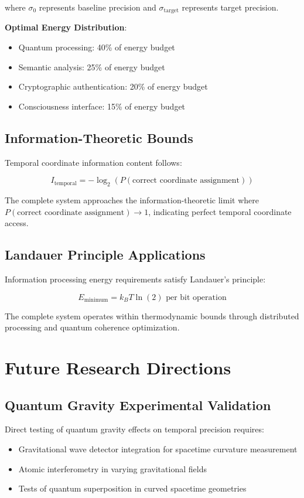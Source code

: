 \documentclass[11pt]{article}
\theoremstyle{remark}
\begin{document}
where $\sigma_0$ represents baseline precision and $\sigma_{\text{target}}$ represents target precision.

\textbf{Optimal Energy Distribution}:
\begin{itemize}
\item Quantum processing: 40\% of energy budget
\item Semantic analysis: 25\% of energy budget
\item Cryptographic authentication: 20\% of energy budget
\item Consciousness interface: 15\% of energy budget
\end{itemize}

\subsection{Information-Theoretic Bounds}

Temporal coordinate information content follows:

$$I_{\text{temporal}} = -\log_2(P(\text{correct coordinate assignment}))$$

The complete system approaches the information-theoretic limit where $P(\text{correct coordinate assignment}) \to 1$, indicating perfect temporal coordinate access.

\subsection{Landauer Principle Applications}

Information processing energy requirements satisfy Landauer's principle:

$$E_{\text{minimum}} = k_B T \ln(2) \text{ per bit operation}$$

The complete system operates within thermodynamic bounds through distributed processing and quantum coherence optimization.

\section{Future Research Directions}

\subsection{Quantum Gravity Experimental Validation}

Direct testing of quantum gravity effects on temporal precision requires:

\begin{itemize}
\item Gravitational wave detector integration for spacetime curvature measurement
\item Atomic interferometry in varying gravitational fields
\item Tests of quantum superposition in curved spacetime geometries
\end{itemize}
\end{document}
